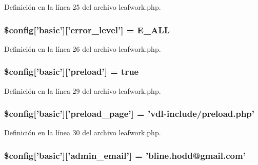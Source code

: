 Definición en la línea 25 del archivo leafwork.\-php.

\hypertarget{config_2leafwork_8php_a02fae42f7bd39779a246e6eef57ea649}{
\subsubsection[{\$config}]{\setlength{\rightskip}{0pt plus 5cm}\${\bf config}\mbox{[}'basic'\mbox{]}\mbox{[}'error\-\_\-level'\mbox{]} = E\-\_\-\-A\-L\-L}}\label{config_2leafwork_8php_a02fae42f7bd39779a246e6eef57ea649}


Definición en la línea 26 del archivo leafwork.\-php.

\hypertarget{config_2leafwork_8php_ab18150a408cc72381f076781e1d2c5f7}{
\subsubsection[{\$config}]{\setlength{\rightskip}{0pt plus 5cm}\${\bf config}\mbox{[}'basic'\mbox{]}\mbox{[}'{\bf preload}'\mbox{]} = true}}\label{config_2leafwork_8php_ab18150a408cc72381f076781e1d2c5f7}


Definición en la línea 29 del archivo leafwork.\-php.

\hypertarget{config_2leafwork_8php_a1d820c59c553e9ef698341bea6cb583b}{
\subsubsection[{\$config}]{\setlength{\rightskip}{0pt plus 5cm}\${\bf config}\mbox{[}'basic'\mbox{]}\mbox{[}'preload\-\_\-page'\mbox{]} = 'vdl-\/include/preload.\-php'}}\label{config_2leafwork_8php_a1d820c59c553e9ef698341bea6cb583b}


Definición en la línea 30 del archivo leafwork.\-php.

\hypertarget{config_2leafwork_8php_a9ba3340a1a3d600f3032680c1ccca82f}{
\subsubsection[{\$config}]{\setlength{\rightskip}{0pt plus 5cm}\${\bf config}\mbox{[}'basic'\mbox{]}\mbox{[}'admin\-\_\-email'\mbox{]} = 'bline.\-hodd@gmail.\-com'}}\label{config_2leafwork_8php_a9ba3340a1a3d600f3032680c1ccca82f}


